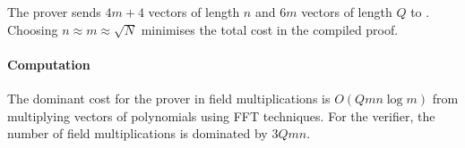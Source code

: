 The prover sends $4m+4$ vectors of length $n$ and $6m$ vectors of length $Q$ to \ILC. %
Choosing $n \approx m \approx \sqrt{N}$ minimises the total cost in the compiled proof. %

\paragraph{Computation}
The dominant cost for the prover in field multiplications is $O(Qmn \log m)$ from multiplying vectors of polynomials using FFT techniques.
For the verifier, the number of field multiplications is dominated by $3Qmn$.

